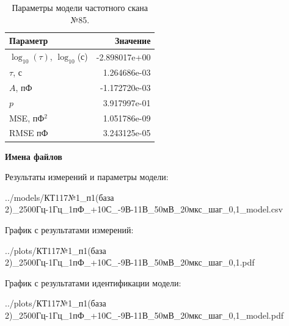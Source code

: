 \begin{table}[!ht]
    \centering
    \caption{Параметры модели частотного скана №85.}
    \begin{tabular}{|l|r|}
        \hline
        Параметр                                       & Значение                  \\ \hline
        $\log_{10}(\tau)$, $\log_{10}$(с)              & -2.898017e+00             \\ \hline
        $\tau$, с                                      & 1.264686e-03              \\ \hline
        $A$, пФ                                        & -1.172720e-03             \\ \hline
        $p$                                            & 3.917997e-01              \\ \hline
        MSE, пФ$^2$                                    & 1.051786e-09              \\ \hline
        RMSE пФ                                        & 3.243125e-05              \\ \hline
    \end{tabular}
    \label{table:frequency_scan_model_85}
\end{table}

\textbf{Имена файлов}

Результаты измерений и параметры модели:

\scriptsize../models/КТ117№1\_п1(база 2)\_2500Гц-1Гц\_1пФ\_+10С\_-9В-11В\_50мВ\_20мкс\_шаг\_0,1\_model.csv
\normalsize

График с результатами измерений:

\scriptsize../plots/КТ117№1\_п1(база 2)\_2500Гц-1Гц\_1пФ\_+10С\_-9В-11В\_50мВ\_20мкс\_шаг\_0,1.pdf
\normalsize

График с результатами идентификации модели:

\scriptsize../plots/КТ117№1\_п1(база 2)\_2500Гц-1Гц\_1пФ\_+10С\_-9В-11В\_50мВ\_20мкс\_шаг\_0,1\_model.pdf
\normalsize

